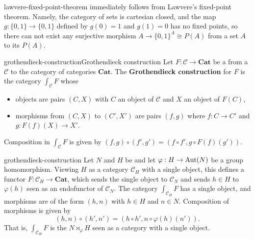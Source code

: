 \begin{example}{lawvere-fixed-point-theorem}
     immediately follows from Lawvere's fixed-point theorem. Namely, the category of sets is cartesian closed, and the map $g : \{ 0, 1 \} \to \{ 0, 1 \}$ defined by $g(0) = 1$ and $g(1) = 0$ has no fixed points, so there can not exist any surjective morphism $A \to \{ 0, 1 \}^A \cong P(A)$ from a set $A$ to its  $P(A)$.
\end{example}

\begin{topic}{grothendieck-construction}{Grothendieck construction}
    Let $F : \mathcal{C} \to \textbf{Cat}$ be a  from a  $\mathcal{C}$ to the category of  categories $\textbf{Cat}$. The \textbf{Grothendieck construction} for $F$ is the category $\int_\mathcal{C} F$ whose
    \begin{itemize}
        \item objects are pairs $(C, X)$ with $C$ an object of $\mathcal{C}$ and $X$ an object of $F(C)$,
        \item morphisms from $(C, X)$ to $(C', X')$ are pairs $(f, g)$ where $f : C \to C'$ and $g : F(f)(X) \to X'$.
    \end{itemize}
    Composition in $\int_\mathcal{C} F$ is given by $(f, g) \circ (f', g') = (f \circ f', g \circ F(f)(g'))$.
\end{topic}

\begin{example}{grothendieck-construction}
    Let $N$ and $H$ be  and let $\varphi : H \to \textup{Aut}(N)$ be a group homomorphism. Viewing $H$ as a category $\mathcal{C}_H$ with a single object, this defines a functor $F : \mathcal{C}_H \to \textbf{Cat}$, which sends the single object to $\mathcal{C}_N$ and sends $h \in H$ to $\varphi(h)$ seen as an endofunctor of $\mathcal{C}_N$. The category $\int_{\mathcal{C}_H} F$ has a single object, and morphisms are of the form $(h, n)$ with $h \in H$ and $n \in N$. Composition of morphisms is given by
    \[ (h, n) \circ (h', n') = (h \circ h', n \circ \varphi(h)(n')) . \]
    That is, $\int_{\mathcal{C}_H} F$ is the  $N \rtimes_\varphi H$ seen as a category with a single object.
\end{example}

